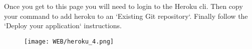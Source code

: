 \documentclass{42-en}
\begin{document}
\newpage

Once you get to this page you will need to login to the Heroku cli. Then copy your command to add heroku to an `Existing Git repository`. Finally follow the `Deploy your application` instructions.
\begin{figure}[H]
    \begin{center}
        \texttt{[image: WEB/heroku\_4.png]}
    \end{center}
\end{figure}

\end{document}
